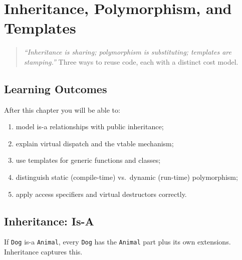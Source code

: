 \chapter{Inheritance, Polymorphism, and Templates}
\label{ch:inheritance-poly-templates}

\begin{quote}
\emph{``Inheritance is sharing; polymorphism is substituting; templates are stamping.''} Three ways to reuse code, each with a distinct cost model.
\end{quote}

\noindent{}

\section*{Learning Outcomes}
After this chapter you will be able to:
\begin{enumerate}[label=(L\arabic*)]
    \item model is-a relationships with public inheritance;
    \item explain virtual dispatch and the vtable mechanism;
    \item use templates for generic functions and classes;
    \item distinguish static (compile-time) vs.\ dynamic (run-time) polymorphism;
    \item apply access specifiers and virtual destructors correctly.
\end{enumerate}

\section{Inheritance: Is-A}
\label{sec:inheritance}
If \texttt{Dog} is-a \texttt{Animal}, every \texttt{Dog} has the \texttt{Animal} part plus its own extensions. Inheritance captures this.


